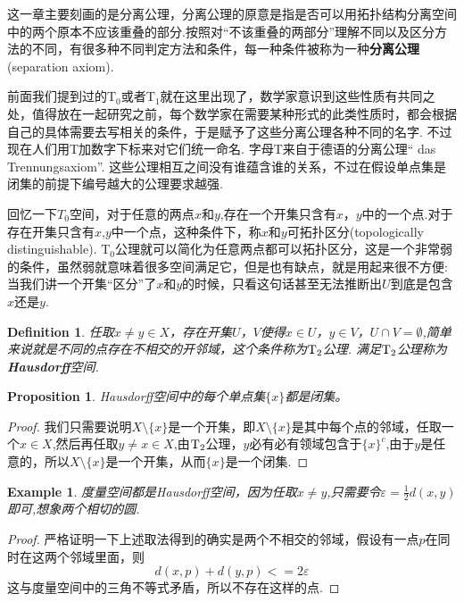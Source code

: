 \documentclass{article}
\newtheorem{proposition}[theorem]{Proposition}
\newtheorem{example}[theorem]{Example}
\newtheorem{definition}[theorem]{Definition}
\begin{document}
这一章主要刻画的是分离公理，分离公理的原意是指是否可以用拓扑结构分离空间中的两个原本不应该重叠的部分.按照对“不该重叠的两部分”理解不同以及区分方法的不同，有很多种不同判定方法和条件，每一种条件被称为一种\textbf{分离公理}(separation axiom).

前面我们提到过的$\text{T}_0$或者$\text{T}_1$就在这里出现了，数学家意识到这些性质有共同之处，值得放在一起研究之前，每个数学家在需要某种形式的此类性质时，都会根据自己的具体需要去写相关的条件，于是赋予了这些分离公理各种不同的名字. 不过现在人们用T加数字下标来对它们统一命名. 字母T来自于德语的分离公理“	das Trennungsaxiom”. 这些公理相互之间没有谁蕴含谁的关系，不过在假设单点集是闭集的前提下编号越大的公理要求越强. 

回忆一下$T_0$空间，对于任意的两点$x$和$y$,存在一个开集只含有$x$，$y$中的一个点.对于存在开集只含有$x$,$y$中一个点，这种条件下，称$x$和$y$可拓扑区分(topologically distinguishable). $\text{T}_0$公理就可以简化为任意两点都可以拓扑区分，这是一个非常弱的条件，虽然弱就意味着很多空间满足它，但是也有缺点，就是用起来很不方便: 当我们讲一个开集“区分”了$x$和$y$的时候，只看这句话甚至无法推断出$U$到底是包含$x$还是$y$.

\begin{definition}
任取$x \neq y \in X$，存在开集$U$，$V$使得$x \in U$，$y \in V$，$U \cap V = \emptyset$,简单来说就是不同的点存在不相交的开邻域，这个条件称为$\rm T_2$公理. 满足$\rm T_2$公理称为\rm\textbf{Hausdorff}空间.
\end{definition}

\begin{proposition}
\rm Hausdorff空间中的每个单点集$\{x\}$都是闭集。
\end{proposition}

\begin{proof}
我们只需要说明$X \setminus \{x\}$是一个开集，即$X \setminus \{x\}$是其中每个点的邻域，任取一个$x \in X$,然后再任取$y \neq x \in X$,由$\rm T_2$公理，$y$必有必有领域包含于$\{x\}^c$,由于$y$是任意的，所以$X \setminus \{x\}$是一个开集，从而$\{x\}$是一个闭集.
\end{proof}

\begin{example}
度量空间都是\rm Hausdorff空间，因为任取$x \neq y$,只需要令$\varepsilon = \frac{1}{2}d(x,y)$即可,想象两个相切的圆.
\end{example}

\begin{proof}
严格证明一下上述取法得到的确实是两个不相交的邻域，假设有一点$p$在同时在这两个邻域里面，则\[d(x,p) + d(y,p) <= 2\varepsilon\]这与度量空间中的三角不等式矛盾，所以不存在这样的点.
\end{proof}
\end{document}
